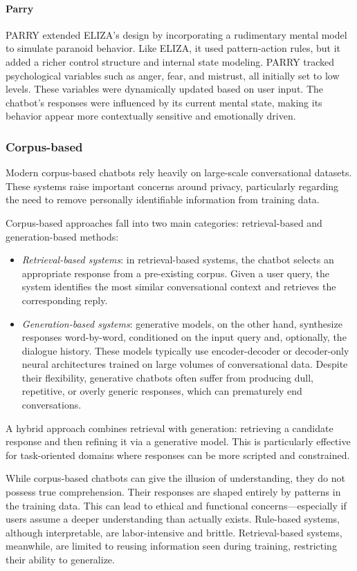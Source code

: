 \paragraph*{Parry}
PARRY extended ELIZA's design by incorporating a rudimentary mental model to simulate paranoid behavior.
Like ELIZA, it used pattern-action rules, but it added a richer control structure and internal state modeling. 
PARRY tracked psychological variables such as anger, fear, and mistrust, all initially set to low levels. 
These variables were dynamically updated based on user input. 
The chatbot's responses were influenced by its current mental state, making its behavior appear more contextually sensitive and emotionally driven.

\subsubsection{Corpus-based}
Modern corpus-based chatbots rely heavily on large-scale conversational datasets. 
These systems raise important concerns around privacy, particularly regarding the need to remove personally identifiable information from training data.

Corpus-based approaches fall into two main categories: retrieval-based and generation-based methods: 
\begin{itemize}
    \item \textit{Retrieval-based systems}: in retrieval-based systems, the chatbot selects an appropriate response from a pre-existing corpus. 
        Given a user query, the system identifies the most similar conversational context and retrieves the corresponding reply. 
    \item \textit{Generation-based systems}: generative models, on the other hand, synthesize responses word-by-word, conditioned on the input query and, optionally, the dialogue history. 
        These models typically use encoder-decoder or decoder-only neural architectures trained on large volumes of conversational data. 
        Despite their flexibility, generative chatbots often suffer from producing dull, repetitive, or overly generic responses, which can prematurely end conversations.
\end{itemize}
\noindent A hybrid approach combines retrieval with generation: retrieving a candidate response and then refining it via a generative model. 
This is particularly effective for task-oriented domains where responses can be more scripted and constrained.

While corpus-based chatbots can give the illusion of understanding, they do not possess true comprehension.
Their responses are shaped entirely by patterns in the training data. 
This can lead to ethical and functional concerns—especially if users assume a deeper understanding than actually exists. 
Rule-based systems, although interpretable, are labor-intensive and brittle. Retrieval-based systems, meanwhile, are limited to reusing information seen during training, restricting their ability to generalize.

